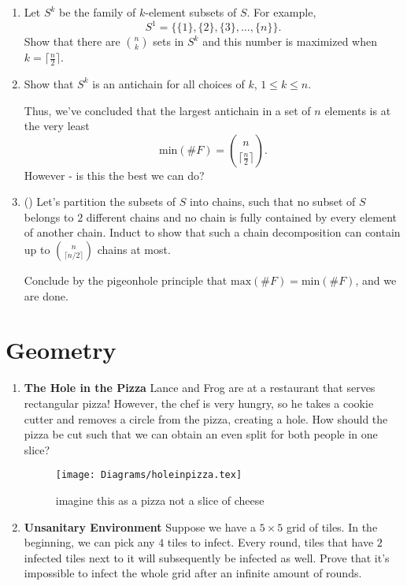 \documentclass[11pt]{scrartcl}
\begin{document}
\begin{enumerate}[label=\textbf{C\arabic*}.]
\begin{enumerate}
        \item Let $S^k$ be the family of $k$-element subsets of $S$. For example,
        \[ S^1 = \{\{1\}, \{2\}, \{3\}, \dots, \{n\}\}. \]
        Show that there are $\binom{n}{k}$ sets in $S^k$ and this number is maximized when $k = \lceil {\frac{n}{2}} \rceil$.
        
        \item Show that $S^k$ is an antichain for all choices of $k$, $1 \leq k \leq n$.
        
        Thus, we've concluded that the largest antichain in a set of $n$ elements is at the very least
        \[ \mathrm{min}(\#F) = \binom{n}{\lceil \frac{n}{2} \rceil}. \]
        However - is this the best we can do?
        
        \item (\fullchili) Let's partition the subsets of $S$ into chains, such that no subset of $S$ belongs to $2$ different chains and no chain is fully contained by every element of another chain. Induct to show that such a chain decomposition can contain up to $\binom{n}{\lceil n/2\rceil}$ chains at most.
        
        Conclude by the pigeonhole principle that $\mathrm{max}(\#F) = \mathrm{min}(\#F)$, and we are done.
    \end{enumerate}
\end{enumerate}

\newpage
\section{Geometry}
\begin{enumerate}[label=\textbf{G\arabic*}.]
    \item \textbf{The Hole in the Pizza} \newline
    Lance and Frog are at a restaurant that serves rectangular pizza! However, the chef is very hungry, so he takes a cookie cutter and removes a circle from the pizza, creating a hole. How should the pizza be cut such that we can obtain an even split for both people in one slice?
    
    \begin{figure}[h]
        \centering
        \texttt{[image: Diagrams/holeinpizza.tex]}
        \caption{imagine this as a pizza not a slice of cheese}
        \label{fig:hole_in_pizza}
    \end{figure}
    
    \item \textbf{Unsanitary Environment} \newline
    Suppose we have a $5 \times 5$ grid of tiles. In the beginning, we can pick any $4$ tiles to infect. Every round, tiles that have $2$ infected tiles next to it will subsequently be infected as well. Prove that it's impossible to infect the whole grid after an infinite amount of rounds.
    
\end{enumerate}
\end{document}
